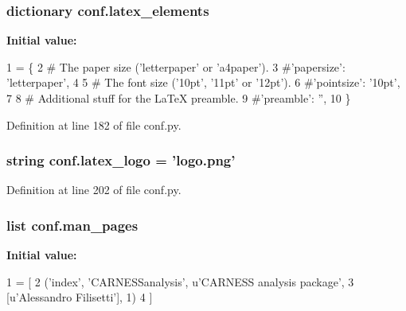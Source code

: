 \hypertarget{a00101_a33619d385ad23765ac6ebb58bf82d43d}{
\subsubsection[{latex\-\_\-elements}]{\setlength{\rightskip}{0pt plus 5cm}dictionary conf.\-latex\-\_\-elements}}\label{a00101_a33619d385ad23765ac6ebb58bf82d43d}
{\bfseries Initial value\-:}
\begin{DoxyCode}
1 = \{
2 \textcolor{comment}{# The paper size ('letterpaper' or 'a4paper').}
3 \textcolor{comment}{#'papersize': 'letterpaper',}
4 
5 \textcolor{comment}{# The font size ('10pt', '11pt' or '12pt').}
6 \textcolor{comment}{#'pointsize': '10pt',}
7 
8 \textcolor{comment}{# Additional stuff for the LaTeX preamble.}
9 \textcolor{comment}{#'preamble': '',}
10 \}
\end{DoxyCode}


Definition at line 182 of file conf.\-py.

\hypertarget{a00101_a8baea114415f64e8f5aad390f5cd4230}{
\subsubsection[{latex\-\_\-logo}]{\setlength{\rightskip}{0pt plus 5cm}string conf.\-latex\-\_\-logo = 'logo.\-png'}}\label{a00101_a8baea114415f64e8f5aad390f5cd4230}


Definition at line 202 of file conf.\-py.

\hypertarget{a00101_a85efc5fee48a26fa2d651f6eeb38fc2b}{
\subsubsection[{man\-\_\-pages}]{\setlength{\rightskip}{0pt plus 5cm}list conf.\-man\-\_\-pages}}\label{a00101_a85efc5fee48a26fa2d651f6eeb38fc2b}
{\bfseries Initial value\-:}
\begin{DoxyCode}
1 = [
2     (\textcolor{stringliteral}{'index'}, \textcolor{stringliteral}{'CARNESSanalysis'}, \textcolor{stringliteral}{u'CARNESS analysis package'},
3      [\textcolor{stringliteral}{u'Alessandro Filisetti'}], 1)
4 ]
\end{DoxyCode}



